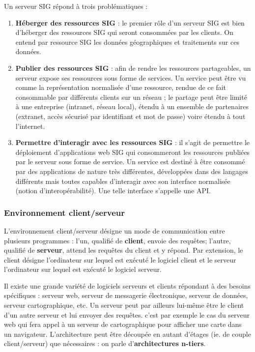\documentclass[11pt]{article}
\begin{document}
Un serveur SIG répond à trois problématiques :
\begin{enumerate}
	\item \textbf{Héberger des ressources SIG} : le premier rôle d'un serveur SIG est bien d'héberger des ressources SIG qui seront consommées par les clients. On entend par ressource SIG les données géographiques et traitements sur ces données.
	\item \textbf{Publier des ressources SIG} : afin de rendre les ressources partageables, un serveur expose ses ressources sous forme de services. Un service peut être vu comme la représentation normalisée d'une ressource, rendue de ce fait consommable par différents clients sur un réseau ; le partage peut être limité à une entreprise (intranet, réseau local), étendu à un ensemble de partenaires (extranet, accès sécurisé par identifiant et mot de passe) voire étendu à tout l'internet.
	\item \textbf{Permettre d'interagir avec les ressources SIG} : il s'agit de permettre le déploiement d'applications web SIG qui consommeront les ressources publiées par le serveur sous forme de service. 
	Un service est destiné à être consommé par des applications de nature très différentes, développées dans des langages différents mais toutes capables d'interagir avec son interface normalisée (notion d'interopérabilité). Une telle interface s'appelle une API.
\end{enumerate}


\subsubsection{Environnement client/serveur}
L'environnement client/serveur désigne un mode de communication entre plusieurs programmes : l'un, qualifié de \textbf{client}, envoie des requêtes; l'autre, qualifié de \textbf{serveur}, attend les requêtes du client et y répond. Par extension, le client désigne l'ordinateur sur lequel est exécuté le logiciel client et le serveur l'ordinateur sur lequel est exécuté le logiciel serveur.

Il existe une grande variété de logiciels serveurs et clients répondant à des besoins spécifiques : serveur web, serveur de messagerie électronique, serveur de données, serveur cartographique, etc. Un serveur peut par ailleurs lui-même être le client d'un autre serveur et lui envoyer des requêtes. c'est par exemple le cas du serveur web qui fera appel à un serveur de cartographique pour afficher une carte dans un navigateur. L'architecture peut être découpée en autant d'étages (ie. de couple client/serveur) que nécessaires : on parle d'\textbf{architectures n-tiers}.
\end{document}
